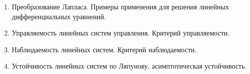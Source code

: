 % 
%

\begin{enumerate}
\item Преобразование Лапласа. Примеры применения для решения линейных дифференциальных уравнений.

\item Управляемость линейных систем управления. Критерий управляемости.

\item Наблюдаемость линейных систем. Критерий наблюдаемости.

\item Устойчивость линейных систем по Ляпунову, асимптотическая устойчивость. 
\end{enumerate}